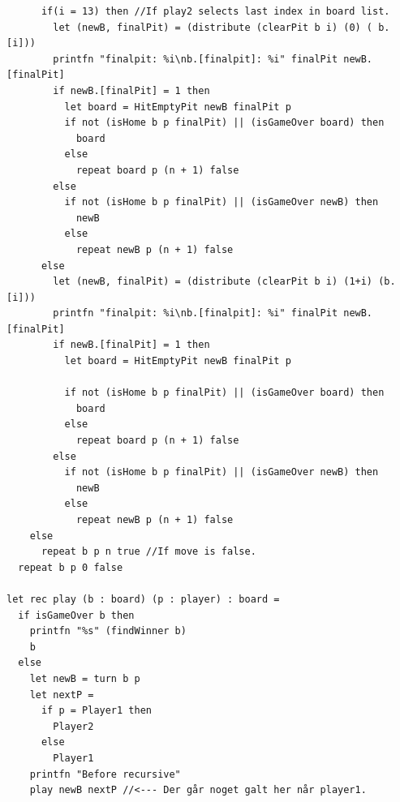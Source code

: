 \documentclass{article}
\begin{document}
\begin{verbatim}
      if(i = 13) then //If play2 selects last index in board list.
        let (newB, finalPit) = (distribute (clearPit b i) (0) ( b.[i]))
        printfn "finalpit: %i\nb.[finalpit]: %i" finalPit newB.[finalPit]
        if newB.[finalPit] = 1 then
          let board = HitEmptyPit newB finalPit p
          if not (isHome b p finalPit) || (isGameOver board) then
            board
          else
            repeat board p (n + 1) false
        else
          if not (isHome b p finalPit) || (isGameOver newB) then
            newB
          else
            repeat newB p (n + 1) false
      else
        let (newB, finalPit) = (distribute (clearPit b i) (1+i) (b.[i]))
        printfn "finalpit: %i\nb.[finalpit]: %i" finalPit newB.[finalPit]
        if newB.[finalPit] = 1 then
          let board = HitEmptyPit newB finalPit p

          if not (isHome b p finalPit) || (isGameOver board) then
            board
          else
            repeat board p (n + 1) false
        else
          if not (isHome b p finalPit) || (isGameOver newB) then
            newB
          else
            repeat newB p (n + 1) false
    else
      repeat b p n true //If move is false.
  repeat b p 0 false

let rec play (b : board) (p : player) : board =
  if isGameOver b then
    printfn "%s" (findWinner b)
    b
  else
    let newB = turn b p
    let nextP =
      if p = Player1 then
        Player2
      else
        Player1
    printfn "Before recursive"
    play newB nextP //<--- Der går noget galt her når player1.

    \end{verbatim}
\end{document}
